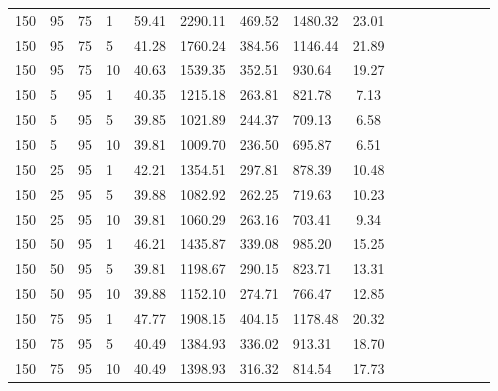 \begin{center}
\begin{table}[h]
\begin{tabular}{clclclclclclclc|c}
150 & 95 & 75 & 1 & \cellcolor{gray!1}59.41 & \cellcolor{gray!1}2290.11 & \cellcolor{gray!1}469.52 & \cellcolor{gray!1}1480.32 & 23.01\\
150 & 95 & 75 & 5 & \cellcolor{gray!36}41.28 & \cellcolor{gray!1}1760.24 & \cellcolor{gray!1}384.56 & \cellcolor{gray!1}1146.44 & 21.89\\
150 & 95 & 75 & 10 & \cellcolor{gray!42}40.63 & \cellcolor{gray!1}1539.35 & \cellcolor{gray!1}352.51 & \cellcolor{gray!1}930.64 & 19.27\\
150 & 5 & 95 & 1 & \cellcolor{gray!45}40.35 & \cellcolor{gray!1}1215.18 & \cellcolor{gray!19}263.81 & \cellcolor{gray!5}821.78 & 7.13\\
150 & 5 & 95 & 5 & \cellcolor{gray!50}39.85 & \cellcolor{gray!33}1021.89 & \cellcolor{gray!41}244.37 & \cellcolor{gray!41}709.13 & 6.58\\
150 & 5 & 95 & 10 & \cellcolor{gray!50}39.81 & \cellcolor{gray!35}1009.70 & \cellcolor{gray!50}236.50 & \cellcolor{gray!45}695.87 & 6.51\\
150 & 25 & 95 & 1 & \cellcolor{gray!26}42.21 & \cellcolor{gray!1}1354.51 & \cellcolor{gray!1}297.81 & \cellcolor{gray!1}878.39 & 10.48\\
150 & 25 & 95 & 5 & \cellcolor{gray!50}39.88 & \cellcolor{gray!22}1082.92 & \cellcolor{gray!21}262.25 & \cellcolor{gray!37}719.63 & 10.23\\
150 & 25 & 95 & 10 & \cellcolor{gray!50}39.81 & \cellcolor{gray!26}1060.29 & \cellcolor{gray!20}263.16 & \cellcolor{gray!42}703.41 & 9.34\\
150 & 50 & 95 & 1 & \cellcolor{gray!1}46.21 & \cellcolor{gray!1}1435.87 & \cellcolor{gray!1}339.08 & \cellcolor{gray!1}985.20 & 15.25\\
150 & 50 & 95 & 5 & \cellcolor{gray!50}39.81 & \cellcolor{gray!1}1198.67 & \cellcolor{gray!1}290.15 & \cellcolor{gray!5}823.71 & 13.31\\
150 & 50 & 95 & 10 & \cellcolor{gray!50}39.88 & \cellcolor{gray!9}1152.10 & \cellcolor{gray!7}274.71 & \cellcolor{gray!23}766.47 & 12.85\\
150 & 75 & 95 & 1 & \cellcolor{gray!1}47.77 & \cellcolor{gray!1}1908.15 & \cellcolor{gray!1}404.15 & \cellcolor{gray!1}1178.48 & 20.32\\
150 & 75 & 95 & 5 & \cellcolor{gray!44}40.49 & \cellcolor{gray!1}1384.93 & \cellcolor{gray!1}336.02 & \cellcolor{gray!1}913.31 & 18.70\\
150 & 75 & 95 & 10 & \cellcolor{gray!44}40.49 & \cellcolor{gray!1}1398.93 & \cellcolor{gray!1}316.32 & \cellcolor{gray!8}814.54 & 17.73\\

\end{tabular}
\end{table}
\end{center}
